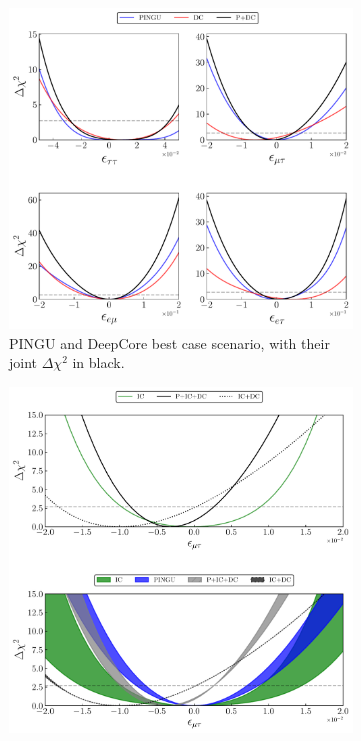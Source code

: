 \documentclass[draft=True]{revtex4-2}
\begin{document}
{\begin{figure}[!tb]
   \begin{center}
      \begin{subfigure}{0.45\textwidth}
         \includegraphics[width=1\linewidth]{figures/joint_3D_NO.pdf}
         \caption{PINGU and DeepCore best case scenario, with their joint $\Delta \chi^2$ in black.}\label{fig:joint_3D}
      \end{subfigure}
      \begin{subfigure}{0.45\textwidth}
         \vspace{1em}
         \includegraphics[width=1\linewidth, height=0.32\textheight]{figures/PID_3D_emt.pdf}

\end{subfigure}
\end{center}
\end{figure}}
\end{document}

